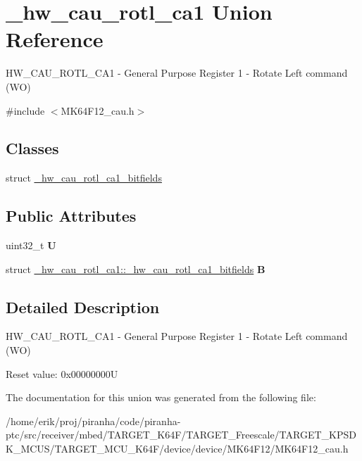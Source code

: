 \hypertarget{union__hw__cau__rotl__ca1}{}\section{\+\_\+hw\+\_\+cau\+\_\+rotl\+\_\+ca1 Union Reference}
\label{union__hw__cau__rotl__ca1}


H\+W\+\_\+\+C\+A\+U\+\_\+\+R\+O\+T\+L\+\_\+\+C\+A1 -\/ General Purpose Register 1 -\/ Rotate Left command (WO)  




{\ttfamily \#include $<$M\+K64\+F12\+\_\+cau.\+h$>$}

\subsection*{Classes}
\begin{DoxyCompactItemize}
\item 
struct \hyperlink{struct__hw__cau__rotl__ca1_1_1__hw__cau__rotl__ca1__bitfields}{\+\_\+hw\+\_\+cau\+\_\+rotl\+\_\+ca1\+\_\+bitfields}
\end{DoxyCompactItemize}
\subsection*{Public Attributes}
\begin{DoxyCompactItemize}
\item 
uint32\+\_\+t {\bfseries U}\hypertarget{union__hw__cau__rotl__ca1_afe6c14f96149a2e425365e4a73c95424}{}\label{union__hw__cau__rotl__ca1_afe6c14f96149a2e425365e4a73c95424}

\item 
struct \hyperlink{struct__hw__cau__rotl__ca1_1_1__hw__cau__rotl__ca1__bitfields}{\+\_\+hw\+\_\+cau\+\_\+rotl\+\_\+ca1\+::\+\_\+hw\+\_\+cau\+\_\+rotl\+\_\+ca1\+\_\+bitfields} {\bfseries B}\hypertarget{union__hw__cau__rotl__ca1_aef4328989608b8f0629592715ac60fb6}{}\label{union__hw__cau__rotl__ca1_aef4328989608b8f0629592715ac60fb6}

\end{DoxyCompactItemize}


\subsection{Detailed Description}
H\+W\+\_\+\+C\+A\+U\+\_\+\+R\+O\+T\+L\+\_\+\+C\+A1 -\/ General Purpose Register 1 -\/ Rotate Left command (WO) 

Reset value\+: 0x00000000U 

The documentation for this union was generated from the following file\+:\begin{DoxyCompactItemize}
\item 
/home/erik/proj/piranha/code/piranha-\/ptc/src/receiver/mbed/\+T\+A\+R\+G\+E\+T\+\_\+\+K64\+F/\+T\+A\+R\+G\+E\+T\+\_\+\+Freescale/\+T\+A\+R\+G\+E\+T\+\_\+\+K\+P\+S\+D\+K\+\_\+\+M\+C\+U\+S/\+T\+A\+R\+G\+E\+T\+\_\+\+M\+C\+U\+\_\+\+K64\+F/device/device/\+M\+K64\+F12/M\+K64\+F12\+\_\+cau.\+h\end{DoxyCompactItemize}
